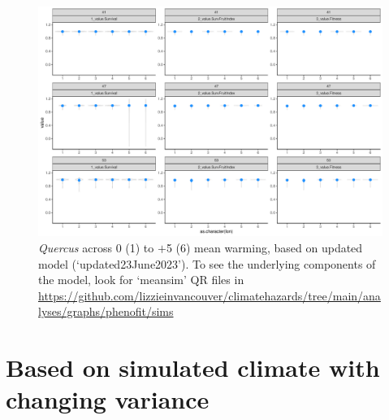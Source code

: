 \documentclass[11pt,letter]{article}
\begin{document}
\begin{figure}[h!]
 \begin{center}
\noindent \includegraphics[width=1\textwidth]{..//analyses/graphs/phenofit/sims/metrics3/meansim_3metricsQR.pdf}
  \caption{\emph{Quercus} across 0 (1) to $+$5 (6) mean warming, based on updated model (`updated23June2023'). To see the underlying components of the model, look for `meansim' QR files in \url{https://github.com/lizzieinvancouver/climatehazards/tree/main/analyses/graphs/phenofit/sims}}
  \label{fig:simsmeanUp}
  \end{center}
\end{figure}


\clearall
\section*{Based on simulated climate with changing variance}
\end{document}
